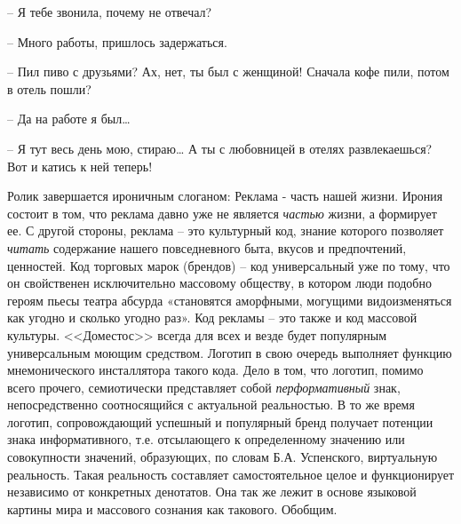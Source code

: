 -- Я тебе звонила, почему не отвечал?

-- Много работы, пришлось задержаться.

-- Пил пиво с друзьями? Ах, нет, ты был с женщиной! Сначала кофе пили, потом в отель пошли?

-- Да на работе я был…

-- Я тут весь день мою, стираю… А ты с любовницей в отелях развлекаешься? Вот и катись к ней теперь!

Ролик завершается ироничным слоганом: Реклама - часть нашей жизни. Ирония состоит в том, что реклама давно уже не является \emph{частью} жизни, а формирует ее. С другой стороны, реклама – это культурный код, знание которого позволяет \emph{читать} содержание нашего повседневного быта, вкусов и предпочтений, ценностей. Код торговых марок (брендов) – код универсальный уже по тому, что он свойственен исключительно массовому обществу, в котором люди подобно героям пьесы театра абсурда «становятся аморфными, могущими видоизменяться как угодно и сколько угодно раз»\autocite[][75]{edoshina2002}. Код рекламы – это также и код массовой культуры. <<Доместос>> всегда для всех и везде будет популярным универсальным моющим средством. Логотип в свою очередь выполняет функцию мнемонического инсталлятора такого кода. Дело в том, что логотип, помимо всего прочего, семиотически представляет собой \emph{перформативный} знак, непосредственно соотносящийся с актуальной реальностью. В то же время логотип, сопровождающий успешный и популярный бренд получает потенции знака информативного, т.е. отсылающего к определенному значению или совокупности значений, образующих, по словам Б.А. Успенского, виртуальную реальность\autocite[][9]{uspenski2007}. Такая реальность составляет самостоятельное целое и функционирует независимо от конкретных денотатов. Она так же лежит в основе языковой картины мира и массового сознания как такового.
Обобщим.

